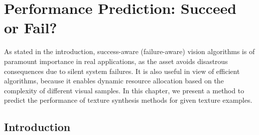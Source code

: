 \chapter{Performance Prediction:  Succeed or Fail?}
\label{ch:forecasting}

As stated in the introduction, success-aware (failure-aware) vision algorithms is of para\-mount importance in real applications, as the asset avoids disastrous consequences due to silent system failures.  It is also useful in view of efficient algorithms, because it enables dynamic resource allocation based on the complexity of different visual samples.   
In this chapter, we present a method to predict the performance of texture synthesis methods for given texture examples.  

\section{Introduction}

